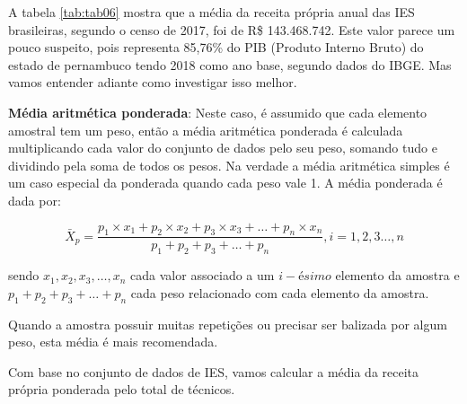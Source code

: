 \documentclass[11pt,]{style/krantz}
\makeatletter
\newenvironment{Shaded}{\begin{snugshade}}{\end{snugshade}}
\newcommand{\DataTypeTok}[1]{\textcolor[rgb]{0.13,0.29,0.53}{#1}}
\newcommand{\KeywordTok}[1]{\textcolor[rgb]{0.13,0.29,0.53}{\textbf{#1}}}
\newcommand{\NormalTok}[1]{#1}
\newcommand{\OperatorTok}[1]{\textcolor[rgb]{0.81,0.36,0.00}{\textbf{#1}}}
\newcommand{\StringTok}[1]{\textcolor[rgb]{0.31,0.60,0.02}{#1}}
\renewenvironment{quote}{\begin{VF}}{\end{VF}}
\newenvironment{kframe}{%
\medskip{}
\setlength{\fboxsep}{.8em}
 \def\at@end@of@kframe{}%
 \ifinner\ifhmode%
  \def\at@end@of@kframe{\end{minipage}}%
  \begin{minipage}{\columnwidth}%
 \fi\fi%
 \def\FrameCommand##1{\hskip\@totalleftmargin \hskip-\fboxsep
 \colorbox{shadecolor}{##1}\hskip-\fboxsep
     \hskip-\linewidth \hskip-\@totalleftmargin \hskip\columnwidth}%
 \MakeFramed {\advance\hsize-\width
   \@totalleftmargin\z@ \linewidth\hsize
   \@setminipage}}%
 {\par\unskip\endMakeFramed%
 \at@end@of@kframe}
\renewenvironment{Shaded}{\begin{kframe}}{\end{kframe}}
\theoremstyle{definition}
\theoremstyle{definition}
\theoremstyle{definition}
\theoremstyle{remark}
\let\BeginKnitrBlock\begin \let\EndKnitrBlock\end
\makeatother
\begin{document}
A tabela \ref{tab:tab06} mostra que a média da receita própria anual das IES brasileiras, segundo o censo de 2017, foi de R\$ 143.468.742. Este valor parece um pouco suspeito, pois representa 85,76\% do PIB (Produto Interno Bruto) do estado de pernambuco tendo 2018 como ano base, segundo dados do IBGE. Mas vamos entender adiante como investigar isso melhor.

\textbf{Média aritmética ponderada}: Neste caso, é assumido que cada elemento amostral tem um peso, então a média aritmética ponderada é calculada multiplicando cada valor do conjunto de dados pelo seu peso, somando tudo e dividindo pela soma de todos os pesos. Na verdade a média aritmética simples é um caso especial da ponderada quando cada peso vale 1. A média ponderada é dada por:

\[\bar X_p = \frac{p_1 \times x_1 + p_2 \times x_2 + p_3\times  x_3 + \dots + p_n \times x_n}{p_1 + p_2 + p_3 + \dots + p_n}, i = 1, 2,3 \dots, n\]

sendo \(x_1, x_2, x_3, \dots , x_n\) cada valor associado a um \(i-ésimo\) elemento da amostra e \(p_1 + p_2 + p_3 + \dots + p_n\) cada peso relacionado com cada elemento da amostra.

\begin{quote}
Quando a amostra possuir muitas repetições ou precisar ser balizada por algum peso, esta média é mais recomendada.
\end{quote}

\BeginKnitrBlock{example}
\protect\hypertarget{exm:unnamed-chunk-49}{}{\label{exm:unnamed-chunk-49} }Com base no conjunto de dados de IES, vamos calcular a média da receita própria ponderada pelo total de técnicos.
\EndKnitrBlock{example}

\begin{Shaded}
\end{Shaded}
\end{document}
